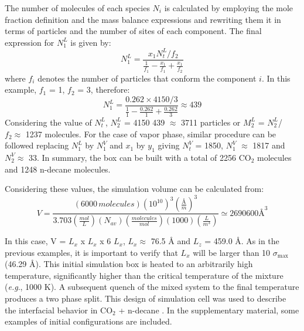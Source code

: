 \documentclass[9pt,bestpractices]{livecoms}
\begin{document}
\begin{mdframed}[linewidth=0pt,backgroundcolor=LiveCoMSLightBlue!8,fontcolor=LiveCoMSDarkBlue!80!black]
The number of molecules of each species $N_{i}$ is calculated by
employing the mole fraction definition and the mass balance expressions and
rewriting them it in terms of particles and the number of sites of each
component. The final expression for $N_{1}^{L}$ is given by:
\begin{equation}
N_{1}^{L}=\frac{x_{1}N_{t}^{L}/f_{2}}{\frac{1}{f_{1}}-\frac{x_{1}}{f_{1}}+\frac{x_{1}}{f_{2}}}
\end{equation}
where $f_{i}$ denotes the number of particles that conform the
component $i$. In this example, $f_{1}$ = 1, $f_{2}$
= 3, therefore:
\begin{equation}
N_{1}^{L}=\frac{0.262\times4150/3}{\frac{1}{1}-\frac{0.262}{1}+\frac{0.262}{3}}\approx439
\end{equation}
Considering the value of $N_{t}^{L}$, $N_{2}^{L}$ = 4150
\textendash{} 439 ${\approx}$ 3711 particles or $M_{2}^{L}$
= $N_{2}^{L}$/$f_{2}{\approx}$ 1237 molecules. For the
case of vapor phase, similar procedure can be followed replacing
$N_{1}^{L}$ by $N_{1}^{V}$ and $x_{1}$ by
$y_{1}$ giving $N_{t}^{V}$ = 1850, $N_{1}^{V}$
${\approx}$ 1817 and $N_{2}^{V}{\approx}$ 33. In summary, the box
can be built with a total of 2256 CO$_{2}$ molecules and 1248 n-decane
molecules.

Considering these values, the simulation volume can be calculated from:
\begin{equation}
V=\frac{\left(6000\,molecules\right)\left(10^{10}\right)^{3}\left(\frac{\textrm{Å}}{m}\right)^{3}}{3.703\left(\frac{mol}{L}\right)\left(N_{av}\right)\left(\frac{molecules}{mol}\right)\left(1000\right)\left(\frac{L}{m^{3}}\right)}\simeq2690600\textrm{Å}^{3}
\end{equation}

In this case, V = $L_{x}$ x $L_{x}$ x 6 $L_{x}$,
$L_{x}{\approx}$ 76.5 \AA{} and $L_{z}$ = 459.0 \AA{}. As
in the previous examples, it is important to verify that $L_{x}$ will
be larger than 10 ${\sigma}_{\mathrm{max}}$ (46.29 \AA{}). This initial
simulation box is heated to an arbitrarily high temperature, significantly
higher than the critical temperature of the mixture (\textit{e.g}., 1000 K).
A subsequent quench of the mixed system to the final temperature produces a two
phase split. This design of simulation cell was used to describe the
interfacial behavior in CO$_{2}$ + n-decane \citep{mejia2014a}. In the supplementary material, some
examples of initial configurations are included.
\end{mdframed}
\end{document}
